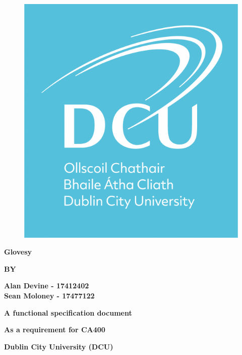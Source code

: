 \documentclass[12pt,a4paper,oneside]{book}
\theoremstyle{plain}
\numberwithin{equation}{chapter}
\begin{document}
\thispagestyle{empty}

\begin{figure}[h!]
\vskip1in
\begin{center}
\includegraphics[width = 3.5 cm]{res/DCU_logo_square.png}
\end{center}
\end{figure}

\begin{center}
\large{\textbf{Glovesy}}
\end{center}

\vskip2.5cm

\begin{center}
\textbf{BY}
\end{center}

\vskip0.6cm

\begin{center}
\textbf{Alan Devine - 17412402}\\
\textbf{Sean Moloney - 17477122}
\end{center}

\vskip3.5cm
 
\begin{center}
\textbf{A functional specification document}
\end{center}

\begin{center}
\textbf{As a requirement for CA400}
\end{center}
\vskip2cm
\begin{center}
\textbf{Dublin City University (DCU)}
\end{center}
\end{document}
